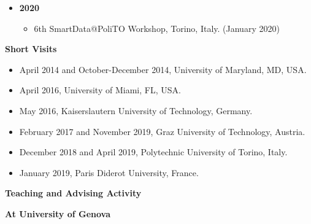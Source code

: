 \documentclass[11pt]{article}
\begin{document}
\begin{itemize}
\begin{itemize}
\item{SoCG 2019, 35th International Symposium on Computational Geometry, Portland, OR, USA. (June 2019)}
\item{{\"O}MG Conference 2019, Dornbirn, Austria. (September 2019)}
\item{5th SmartData@PoliTO Workshop, Barolo, Italy. (September 2019)}
\item{Complex Simplex: Topological and Network Data Science Workshop, Torino, Italy. (October 2019)}
\end{itemize}
\vspace*{0.2ex}
\item[ ]{\bf 2020}
\begin{itemize}
\item{6th SmartData@PoliTO Workshop, Torino, Italy. (January 2020)}
\end{itemize}
\end{itemize}

\vspace*{2.5ex}
\noindent
{\Large\bf Short Visits}
\begin{itemize}
\item April 2014 and October-December 2014, University of Maryland, MD, USA.
\item April 2016, University of Miami, FL, USA.
\item May 2016, Kaiserslautern University of Technology, Germany.
\item February 2017 and November 2019, Graz University of Technology, Austria.
\item December 2018 and April 2019, Polytechnic University of Torino, Italy.
\item January 2019, Paris Diderot University, France.
\end{itemize}



\vspace*{2.5ex}

\noindent
{\Large\bf Teaching and Advising Activity}

\vspace*{1.5ex}
\noindent
{\bf At University of Genova}
\end{document}
